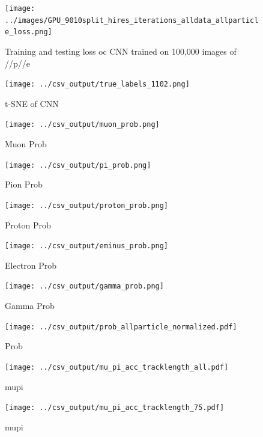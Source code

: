 \begin{figure}[htp]
\centering
\texttt{[image: ../images/GPU\_9010split\_hires\_iterations\_alldata\_allparticle\_loss.png]}
\caption{Training and testing loss oc CNN trained on 100,000 images of \mu/\pi/p/\gamma/e}
\label{fig:gpuloss}
\end{figure}

\begin{figure}[htp]
\centering
\texttt{[image: ../csv\_output/true\_labels\_1102.png]}
\caption{t-SNE of CNN}
\label{fig:tsne}
\end{figure}

\begin{figure}[htp]
\centering
\texttt{[image: ../csv\_output/muon\_prob.png]}
\caption{Muon Prob}
\label{fig:muonprob}
\end{figure}

\begin{figure}[htp]
\centering
\texttt{[image: ../csv\_output/pi\_prob.png]}
\caption{Pion Prob}
\label{fig:piprob}
\end{figure}

\begin{figure}[htp]
\centering
\texttt{[image: ../csv\_output/proton\_prob.png]}
\caption{Proton Prob}
\label{fig:protonprob}
\end{figure}

\begin{figure}[htp]
\centering
\texttt{[image: ../csv\_output/eminus\_prob.png]}
\caption{Electron Prob}
\label{fig:eminusprob}
\end{figure}

\begin{figure}[htp]
\centering
\texttt{[image: ../csv\_output/gamma\_prob.png]}
\caption{Gamma Prob}
\label{fig:gammaprob}
\end{figure}

\begin{figure}[htp]
\centering
\texttt{[image: ../csv\_output/prob\_allparticle\_normalized.pdf]}
\caption{Prob}
\label{fig:prob}
\end{figure}

\begin{figure}[htp]
\centering
\texttt{[image: ../csv\_output/mu\_pi\_acc\_tracklength\_all.pdf]}
\caption{mupi}
\label{fig:mu_pi}
\end{figure}

\begin{figure}[htp]
\centering
\texttt{[image: ../csv\_output/mu\_pi\_acc\_tracklength\_75.pdf]}
\caption{mupi}
\label{fig:mu_pi}
\end{figure}

